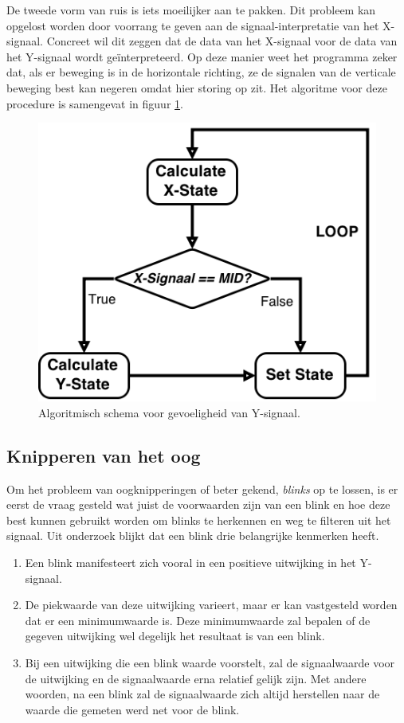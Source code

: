 \documentclass{article}
\begin{document}
De tweede vorm van ruis is iets moeilijker aan te pakken. Dit probleem kan opgelost worden door voorrang te geven aan de signaal-interpretatie van het X-signaal. Concreet wil dit zeggen dat de data van het X-signaal voor de data van het Y-signaal wordt ge\"interpreteerd. Op deze manier weet het programma zeker dat, als er beweging is in de horizontale richting, ze de signalen van de verticale beweging best kan negeren omdat hier storing op zit. Het algoritme voor deze procedure is samengevat in figuur \ref{fig:algogevoeligheidY}.
\begin{figure}[H]
\centering
\includegraphics[width=0.7\linewidth]{images/GevoeligheidY}
\caption{Algoritmisch schema voor gevoeligheid van Y-signaal.}
\label{fig:algogevoeligheidY}
\end{figure}

\subsection{Knipperen van het oog}
Om het probleem van oogknipperingen of beter gekend, \textit{blinks }op te lossen, is er eerst de vraag gesteld wat juist de voorwaarden zijn van een blink en hoe deze best kunnen gebruikt worden om blinks te herkennen en weg te filteren uit het signaal. Uit onderzoek \cite{Bulling:eyeanalysis} blijkt dat een blink drie belangrijke kenmerken heeft. 
\begin{enumerate}
	\item Een blink manifesteert zich vooral in een positieve uitwijking in het Y-signaal.
	\item De piekwaarde van deze uitwijking varieert, maar er kan vastgesteld worden dat er een minimumwaarde is. Deze minimumwaarde zal bepalen of de gegeven uitwijking wel degelijk het resultaat is van een blink.
	\item Bij een uitwijking die een blink waarde voorstelt, zal de signaalwaarde voor de uitwijking en de signaalwaarde erna relatief gelijk zijn. Met andere woorden, na een blink zal de signaalwaarde zich altijd herstellen naar de waarde die gemeten werd net voor de blink.
\end{enumerate}
\end{document}
